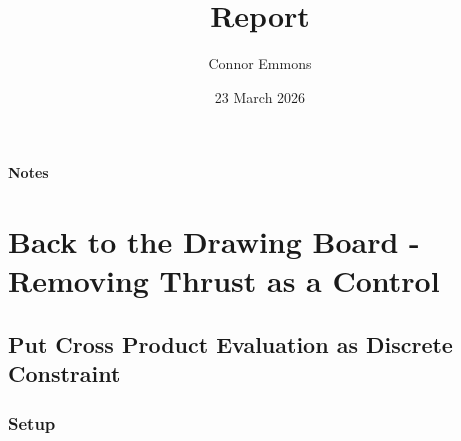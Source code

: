 \documentclass{article}
\title{Report}
\date{23 March 2026}
\author{Connor Emmons}
\begin{document}
\maketitle
\vfill
\paragraph*{Notes}

\newpage
{}

\tableofcontents

\newpage

\section{Back to the Drawing Board - Removing Thrust as a Control}

\subsection{Put Cross Product Evaluation as Discrete Constraint}

\subsubsection{Setup}
\end{document}
